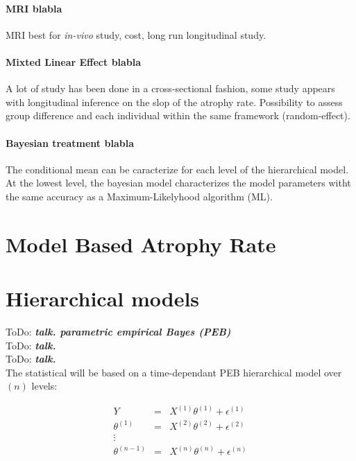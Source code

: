 \documentclass[final, paper=letter,5p,times,twocolumn]{elsarticle}
\newcommand{\ToDo}[1]{ToDo: \textbf{\textit{#1}}}
\theoremstyle{definition}
\begin{document}
\paragraph{MRI blabla}{MRI best for {\it in-vivo} study, cost, long run longitudinal study.}

\paragraph{Mixted Linear Effect blabla}{A lot of study has been done in a cross-sectional fashion, some study appears with longitudinal inference on the slop of the atrophy rate. Possibility to assess group difference and each individual within the same framework (random-effect).}

\paragraph{Bayesian treatment blabla}{The conditional mean can be caracterize for each level of the hierarchical model. At the lowest level, the bayesian model characterizes the model parameters witht the same accuracy as a Maximum-Likelyhood algorithm (ML).}


\section{Model Based Atrophy Rate}

\section{Hierarchical models}

\ToDo{talk. parametric empirical Bayes (PEB)} \\
\ToDo{talk. } \\
\ToDo{talk. } \\

The statistical will be based on a time-dependant PEB hierarchical model over $(n)$ levels:

\begin{equation}
  \left .
  \begin{array}{rcl}
    Y & = & X^{(1)} \theta^{(1)} + \epsilon^{(1)} \\
    \theta^{(1)}& = & X^{(2)} \theta^{(2)} + \epsilon^{(2)} \\
    \vdots && \\
    \theta^{(n-1)}& = & X^{(n)} \theta^{(n)} + \epsilon^{(n)} \\
  \end{array}
  \right .
  \label{hierarchical_model}
\end{equation}
\end{document}
